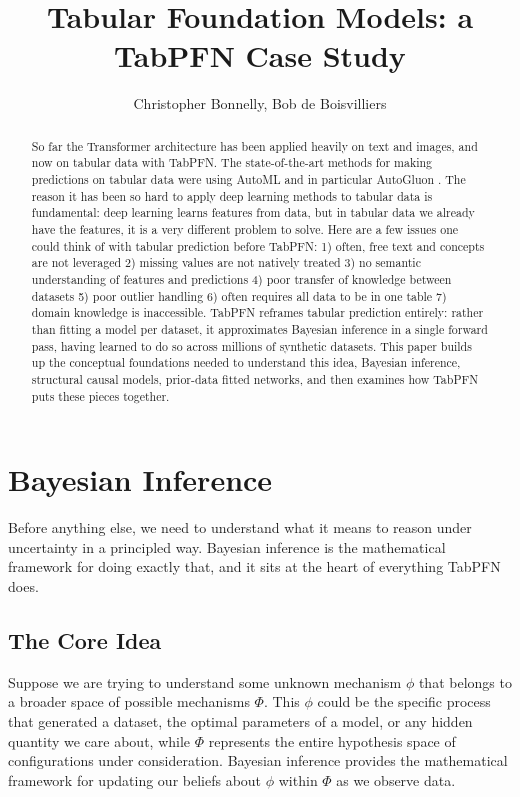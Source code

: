 \documentclass[12pt]{article}
\title{Tabular Foundation Models: a TabPFN Case Study}
\author{Christopher Bonnelly, Bob de Boisvilliers}
\begin{document}
\maketitle

\begin{abstract}
So far the Transformer architecture has been applied heavily on text and images, and now on tabular data with TabPFN. The state-of-the-art methods for making predictions on tabular data were using AutoML and in particular AutoGluon \cite{ericson2020autogluon}. The reason it has been so hard to apply deep learning methods to tabular data is fundamental: deep learning learns features from data, but in tabular data we already have the features,  it is a very different problem to solve. Here are a few issues one could think of with tabular prediction before TabPFN: 1) often, free text and concepts are not leveraged 2) missing values are not natively treated 3) no semantic understanding of features and predictions 4) poor transfer of knowledge between datasets 5) poor outlier handling 6) often requires all data to be in one table 7) domain knowledge is inaccessible. TabPFN reframes tabular prediction entirely: rather than fitting a model per dataset, it approximates Bayesian inference in a single forward pass, having learned to do so across millions of synthetic datasets. This paper builds up the conceptual foundations needed to understand this idea,  Bayesian inference, structural causal models, prior-data fitted networks,  and then examines how TabPFN puts these pieces together.
\end{abstract}

\section{Bayesian Inference}

Before anything else, we need to understand what it means to reason under uncertainty in a principled way. Bayesian inference is the mathematical framework for doing exactly that, and it sits at the heart of everything TabPFN does.

\subsection{The Core Idea}

Suppose we are trying to understand some unknown mechanism $\phi$ that belongs to a broader space of possible mechanisms $\Phi$. This $\phi$ could be the specific process that generated a dataset, the optimal parameters of a model, or any hidden quantity we care about, while $\Phi$ represents the entire hypothesis space of configurations under consideration. Bayesian inference provides the mathematical framework for updating our beliefs about $\phi$ within $\Phi$ as we observe data.
\end{document}
